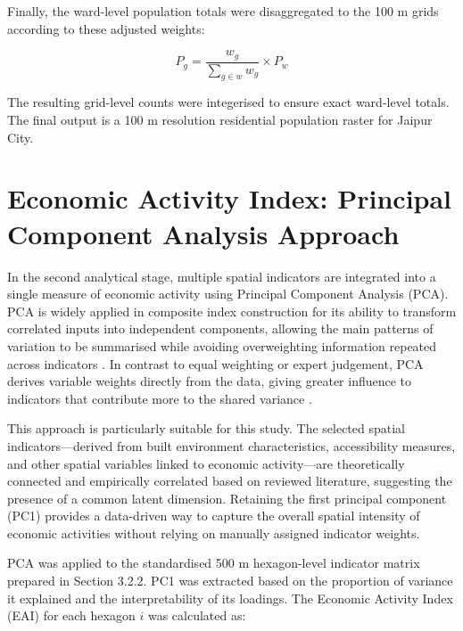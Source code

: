 \documentclass[
  12pt,
  oneside]{book}
\begin{document}
Finally, the ward-level population totals were disaggregated to the 100 m grids according to these adjusted weights:

\begin{equation} 
P_g = \frac{w_g}{\sum_{g \in w} w_g} \times P_w
  \label{eq:POPweights}
\end{equation}

The resulting grid-level counts were integerised to ensure exact ward-level totals. The final output is a 100 m resolution residential population raster for Jaipur City.

\section{Economic Activity Index: Principal Component Analysis Approach}\label{economic-activity-index-principal-component-analysis-approach}

In the second analytical stage, multiple spatial indicators are integrated into a single measure of economic activity using Principal Component Analysis (PCA). PCA is widely applied in composite index construction for its ability to transform correlated inputs into independent components, allowing the main patterns of variation to be summarised while avoiding overweighting information repeated across indicators \autocite{vyasConstructingSocioeconomicStatus2006a,conlonMappingHumanVulnerability2020}. In contrast to equal weighting or expert judgement, PCA derives variable weights directly from the data, giving greater influence to indicators that contribute more to the shared variance \autocite{brobyUsePrincipalComponents2022a}.

This approach is particularly suitable for this study. The selected spatial indicators---derived from built environment characteristics, accessibility measures, and other spatial variables linked to economic activity---are theoretically connected and empirically correlated based on reviewed literature, suggesting the presence of a common latent dimension. Retaining the first principal component (PC1) provides a data-driven way to capture the overall spatial intensity of economic activities without relying on manually assigned indicator weights.

PCA was applied to the standardised 500 m hexagon-level indicator matrix prepared in Section 3.2.2. PC1 was extracted based on the proportion of variance it explained and the interpretability of its loadings. The Economic Activity Index (EAI) for each hexagon \(i\) was calculated as:
\end{document}
